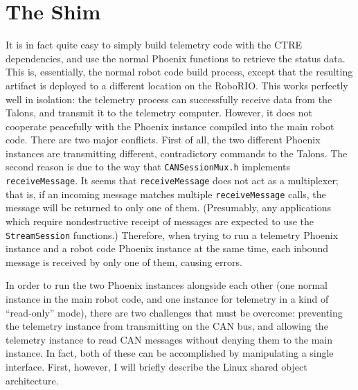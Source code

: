 \documentclass[12pt]{article}
\begin{document}
\section{The Shim}
\par It is in fact quite easy to simply build telemetry code with the CTRE dependencies, and use the normal Phoenix functions to retrieve the status data. This is, essentially, the normal robot code build process, except that the resulting artifact is deployed to a different location on the RoboRIO. This works perfectly well in isolation: the telemetry process can successfully receive data from the Talons, and transmit it to the telemetry computer. However, it does not cooperate peacefully with the Phoenix instance compiled into the main robot code. There are two major conflicts. First of all, the two different Phoenix instances are transmitting different, contradictory commands to the Talons. The second reason is due to the way that \texttt{CANSessionMux.h} implements \texttt{receiveMessage}. It seems that \texttt{receiveMessage} does not act as a multiplexer; that is, if an incoming message matches multiple \texttt{receiveMessage} calls, the message will be returned to only one of them. (Presumably, any applications which require nondestructive receipt of messages are expected to use the \texttt{StreamSession} functions.) Therefore, when trying to run a telemetry Phoenix instance and a robot code Phoenix instance at the same time, each inbound message is received by only one of them, causing errors. 
\par In order to run the two Phoenix instances alongside each other (one normal instance in the main robot code, and one instance for telemetry in a kind of ``read-only'' mode), there are two challenges that must be overcome: preventing the telemetry instance from transmitting on the CAN bus, and allowing the telemetry instance to read CAN messages without denying them to the main instance. In fact, both of these can be accomplished by manipulating a single interface. First, however, I will briefly describe the Linux shared object architecture. 


\newpage
\appendix

\newpage
\begin{thebibliography}{9}

\end{thebibliography}
\end{document}
